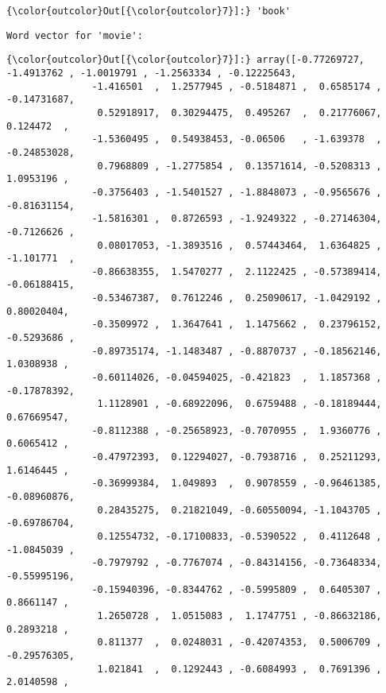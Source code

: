 \documentclass[11pt]{article}
\begin{document}
\begin{Verbatim}[commandchars=\\\{\}]
{\color{outcolor}Out[{\color{outcolor}7}]:} 'book'
\end{Verbatim}
            
    \begin{Verbatim}[commandchars=\\\{\}]
Word vector for 'movie':

    \end{Verbatim}

\begin{Verbatim}[commandchars=\\\{\}]
{\color{outcolor}Out[{\color{outcolor}7}]:} array([-0.77269727, -1.4913762 , -1.0019791 , -1.2563334 , -0.12225643,
               -1.416501  ,  1.2577945 , -0.5184871 ,  0.6585174 , -0.14731687,
                0.52918917,  0.30294475,  0.495267  ,  0.21776067,  0.124472  ,
               -1.5360495 ,  0.54938453, -0.06506   , -1.639378  , -0.24853028,
                0.7968809 , -1.2775854 ,  0.13571614, -0.5208313 ,  1.0953196 ,
               -0.3756403 , -1.5401527 , -1.8848073 , -0.9565676 , -0.81631154,
               -1.5816301 ,  0.8726593 , -1.9249322 , -0.27146304, -0.7126626 ,
                0.08017053, -1.3893516 ,  0.57443464,  1.6364825 , -1.101771  ,
               -0.86638355,  1.5470277 ,  2.1122425 , -0.57389414, -0.06188415,
               -0.53467387,  0.7612246 ,  0.25090617, -1.0429192 ,  0.80020404,
               -0.3509972 ,  1.3647641 ,  1.1475662 ,  0.23796152, -0.5293686 ,
               -0.89735174, -1.1483487 , -0.8870737 , -0.18562146,  1.0308938 ,
               -0.60114026, -0.04594025, -0.421823  ,  1.1857368 , -0.17878392,
                1.1128901 , -0.68922096,  0.6759488 , -0.18189444,  0.67669547,
               -0.8112388 , -0.25658923, -0.7070955 ,  1.9360776 ,  0.6065412 ,
               -0.47972393,  0.12294027, -0.7938716 ,  0.25211293,  1.6146445 ,
               -0.36999384,  1.049893  ,  0.9078559 , -0.96461385, -0.08960876,
                0.28435275,  0.21821049, -0.60550094, -1.1043705 , -0.69786704,
                0.12554732, -0.17100833, -0.5390522 ,  0.4112648 , -1.0845039 ,
               -0.7979792 , -0.7767074 , -0.84314156, -0.73648334, -0.55995196,
               -0.15940396, -0.8344762 , -0.5995809 ,  0.6405307 ,  0.8661147 ,
                1.2650728 ,  1.0515083 ,  1.1747751 , -0.86632186,  0.2893218 ,
                0.811377  ,  0.0248031 , -0.42074353,  0.5006709 , -0.29576305,
                1.021841  ,  0.1292443 , -0.6084993 ,  0.7691396 ,  2.0140598 ,

\end{Verbatim}
\end{document}
